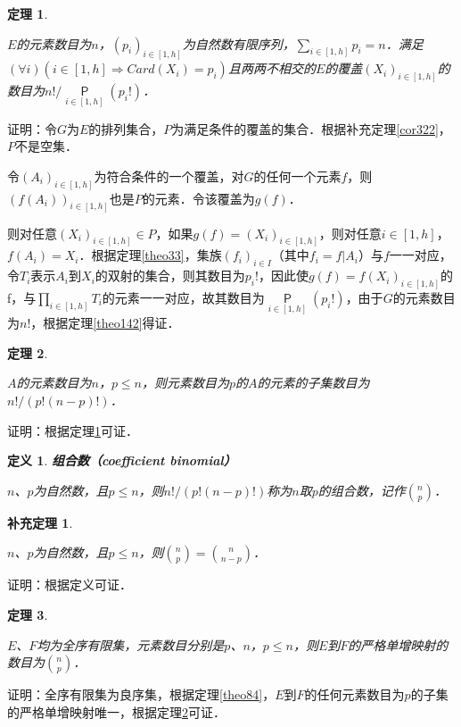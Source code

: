 \documentclass[12pt, a4paper, oneside]{book}
\newtheorem{theo}{定理}
\newtheorem{cor}{补充定理}
\newtheorem{de}{定义}
\begin{document}
			\begin{theo}\label{theo145}
				\hfill\par
				$E$的元素数目为$n$，$(p_i)_{i\in [1, h]}$为自然数有限序列，$\sum\limits_{i\in [1, h]}p_i=n$．满足$(\forall i)(i\in [1, h]\Rightarrow Card(X_i)=p_i)$且两两不相交的$E$的覆盖$(X_i)_{i\in [1, h]}$的数目为$n!/\mathop{\mathsf{P}}\limits_{i\in [1, h]}(p_i!)$．
			\end{theo}
			证明：令$G$为$E$的排列集合，$P$为满足条件的覆盖的集合．根据补充定理\ref{cor322}，$P$不是空集．
			\par
			令$(A_i)_{i\in [1, h]}$为符合条件的一个覆盖，对$G$的任何一个元素$f$，则$(f(A_i))_{i\in [1, h]}$也是$P$的元素．令该覆盖为$g(f)$．
			\par
			则对任意$(X_i)_{i\in [1, h]}\in P$，如果$g(f)=(X_i)_{i\in [1, h]}$，则对任意$i\in [1, h]$，$f(A_i)=X_i$．根据定理\ref{theo33}，集族$(f_i)_{i\in I}$（其中$f_i=f|A_i$）与$f$一一对应，令$T_i$表示$A_i$到$X_i$的双射的集合，则其数目为$p_i!$，因此使$g(f)=f(X_i)_{i\in [1, h]}$的f，与$\prod\limits_{i\in [1, h]}T_i$的元素一一对应，故其数目为$\mathop{\mathsf{P}}\limits_{i\in [1, h]}(p_i!)$，由于$G$的元素数目为$n!$，根据定理\ref{theo142}得证．
			
			\begin{theo}\label{theo146}
				\hfill\par
				$A$的元素数目为$n$，$p\leq n$，则元素数目为$p$的$A$的元素的子集数目为$n!/(p!(n-p)!)$．
			\end{theo}
			证明：根据定理\ref{theo145}可证．
			
			\begin{de}
				\textbf{组合数（coefficient binomial）}
				\par
				$n$、$p$为自然数，且$p\leq n$，则$n!/(p!(n-p)!)$称为$n$取$p$的组合数，记作$\binom{n}{p}$．
			\end{de}
			
			\begin{cor}\label{cor323}
				\hfill\par
				$n$、$p$为自然数，且$p\leq n$，则$\binom{n}{p}=\binom{n}{n-p}$．
			\end{cor}
			证明：根据定义可证．
			
			\begin{theo}\label{theo147}
				\hfill\par
				$E$、$F$均为全序有限集，元素数目分别是$p$、$n$，$p\leq n$，则$E$到$F$的严格单增映射的数目为$\binom{n}{p}$．
			\end{theo}
			证明：全序有限集为良序集，根据定理\ref{theo84}，$E$到$F$的任何元素数目为$p$的子集的严格单增映射唯一，根据定理\ref{theo146}可证．
			
\end{document}
